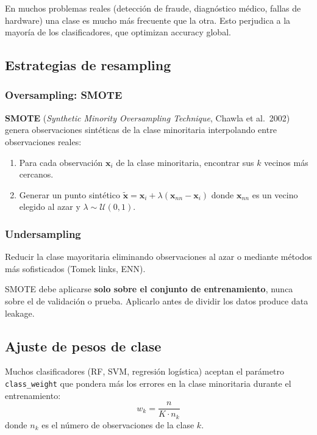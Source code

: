 \documentclass[12pt, a4paper]{article}
\theoremstyle{definition}
\theoremstyle{plain}
\theoremstyle{remark}
\newcommand{\bx}{\bm{x}}
\begin{document}
En muchos problemas reales (detección de fraude, diagnóstico médico, fallas de hardware) una clase es mucho más frecuente que la otra. Esto perjudica a la mayoría de los clasificadores, que optimizan accuracy global.

\subsection{Estrategias de resampling}

\subsubsection{Oversampling: SMOTE}

\textbf{SMOTE} (\textit{Synthetic Minority Oversampling Technique}, Chawla et al.\ 2002) genera observaciones sintéticas de la clase minoritaria interpolando entre observaciones reales:
\begin{enumerate}
  \item Para cada observación $\bx_i$ de la clase minoritaria, encontrar sus $k$ vecinos más cercanos.
  \item Generar un punto sintético $\tilde{\bx} = \bx_i + \lambda (\bx_{nn} - \bx_i)$ donde $\bx_{nn}$ es un vecino elegido al azar y $\lambda \sim \mathcal{U}(0,1)$.
\end{enumerate}

\subsubsection{Undersampling}

Reducir la clase mayoritaria eliminando observaciones al azar o mediante métodos más sofisticados (Tomek links, ENN).

\begin{alerta}
  SMOTE debe aplicarse \textbf{solo sobre el conjunto de entrenamiento}, nunca sobre el de validación o prueba. Aplicarlo antes de dividir los datos produce data leakage.
\end{alerta}

\subsection{Ajuste de pesos de clase}

Muchos clasificadores (RF, SVM, regresión logística) aceptan el parámetro \texttt{class\_weight} que pondera más los errores en la clase minoritaria durante el entrenamiento:
\[
  w_k = \frac{n}{K \cdot n_k}
\]
donde $n_k$ es el número de observaciones de la clase $k$.
\end{document}
